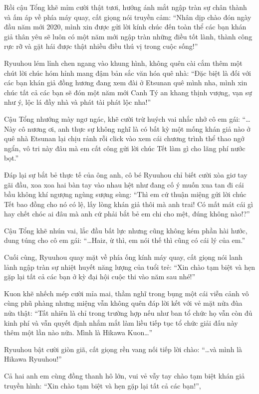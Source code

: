 \documentclass[../main.tex]{subfiles}
\begin{document}
Rồi cậu Tổng khẽ mỉm cười thật tươi, hướng ánh mắt ngập tràn sự chân thành và ấm áp về phía máy quay, cất giọng nói truyền cảm: ``Nhân dịp chào đón ngày đầu năm mới 2020, mình xin được gửi lời kính chúc đến toàn thể các bạn khán giả thân yêu sẽ luôn có một năm mới ngập tràn những điều tốt lành, thành công rực rỡ và gặt hái được thật nhiều điều thú vị trong cuộc sống!''

Ryuuhou lém lỉnh chen ngang vào khung hình, không quên cài cắm thêm một chút lời chúc hóm hỉnh mang đậm bản sắc văn hóa quê nhà: ``Đặc biệt là đối với các bạn khán giả đồng hương đang xem đài ở Etsunan quê mình nha, mình xin chúc tất cả các bạn sẽ đón một năm mới Canh Tý an khang thịnh vượng, vạn sự như ý, lộc lá đầy nhà và phát tài phát lộc nha!''

Cậu Tổng nhướng mày ngơ ngác, khẽ cười trừ huých vai nhắc nhở cô em gái: ``\dots Này cô nương ơi, anh thực sự không nghĩ là có bất kỳ một mống khán giả nào ở quê nhà Etsunan lại chịu rảnh rỗi click vào xem cái chương trình thể thao ngớ ngẩn, vô tri này đâu mà em cất công gửi lời chúc Tết làm gì cho lãng phí nước bọt.''

Đáp lại sự bắt bẻ thực tế của ông anh, cô bé Ryuuhou chỉ biết cười xòa giơ tay gãi đầu, xoa xoa hai bàn tay vào nhau hệt như đang cố ý muốn xua tan đi cái bầu không khí ngượng ngùng sượng sùng: ``Thì em cứ thuận miệng gửi lời chúc Tết bao đồng cho nó có lệ, lấy lòng khán giả thôi mà anh trai! Có mất mát cái gì hay chết chóc ai đâu mà anh cứ phải bắt bẻ em chi cho mệt, đúng không nào!?''

Cậu Tổng khẽ nhún vai, lắc đầu bất lực nhưng cũng không kém phần hài hước, dung túng cho cô em gái: ``\dots Haiz, ừ thì, em nói thế thì cũng có cái lý của em.''

Cuối cùng, Ryuuhou quay mặt về phía ống kính máy quay, cất giọng nói lanh lảnh ngập tràn sự nhiệt huyết năng lượng của tuổi trẻ: ``Xin chào tạm biệt và hẹn gặp lại tất cả các bạn ở kỳ đại hội cuộc thi vào năm sau nhé!''

Kuon khẽ nhếch mép cười mỉa mai, thầm nghĩ trong bụng một cái viễn cảnh vô cùng phũ phàng nhưng miệng vẫn không quên đáp lời kết với vẻ mặt nửa đùa nửa thật: ``Tất nhiên là chỉ trong trường hợp nếu như ban tổ chức họ vẫn còn đủ kinh phí và vẫn quyết định nhắm mắt làm liều tiếp tục tổ chức giải đấu này thêm một lần nào nữa. Mình là Hikawa Kuon\dots''

Ryuuhou bật cười giòn giã, cất giọng rền vang nối tiếp lời chào: ``\dots và mình là Hikawa Ryuuhou!''

Cả hai anh em cùng đồng thanh hô lớn, vui vẻ vẫy tay chào tạm biệt khán giả truyền hình: ``Xin chào tạm biệt và hẹn gặp lại tất cả các bạn!'',
\end{document}
